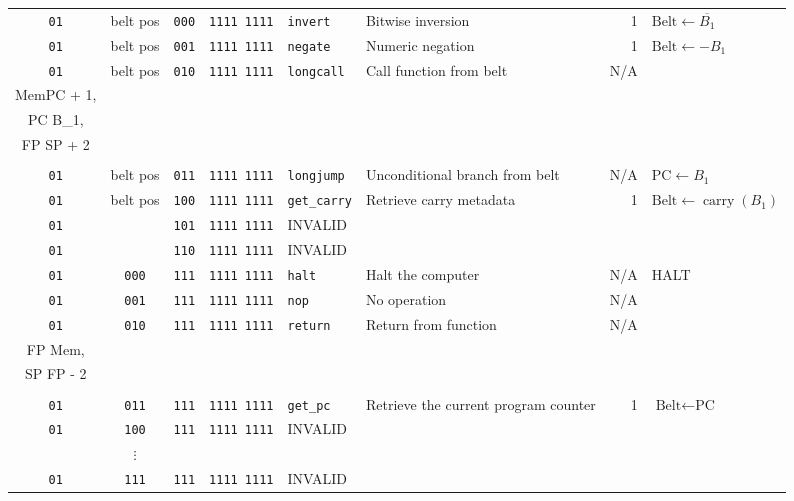 \documentclass{article}
\begin{document}
\begin{landscape}
\begin{longtable}{c c c c l l r l}
		\texttt{01} & belt pos & \texttt{000} & \texttt{1111 1111} & \texttt{invert}     & Bitwise inversion              & 1   & \(
			\textrm{Belt} \gets \overline{B_1}\) \\
		\texttt{01} & belt pos & \texttt{001} & \texttt{1111 1111} & \texttt{negate}     & Numeric negation               & 1   & \(
			\textrm{Belt} \gets -B_1\) \\
		\texttt{01} & belt pos & \texttt{010} & \texttt{1111 1111} & \texttt{longcall}   & Call function from belt        & N/A & \(
			\begin{array}{l}
				\textrm{Mem}\left[\textrm{SP}\right] \gets \textrm{FP}, \\
				\textrm{Mem}\left[\textrm{SP} + 1\right] \gets \textrm{PC} + 1, \\
				\textrm{PC} \gets B_1, \\
				\textrm{FP} \gets \textrm{SP} + 2 \\
			\end{array}\) \\
		\texttt{01} & belt pos & \texttt{011} & \texttt{1111 1111} & \texttt{longjump}   & Unconditional branch from belt & N/A & \(
			\textrm{PC} \gets B_1\) \\
		\texttt{01} & belt pos & \texttt{100} & \texttt{1111 1111} & \texttt{get\_carry} & Retrieve carry metadata        & 1   & \(
			\textrm{Belt} \gets \operatorname{carry}\left(B_1\right)\) \\
		\texttt{01} & & \texttt{101} & \texttt{1111 1111} & INVALID & \\
		\texttt{01} & & \texttt{110} & \texttt{1111 1111} & INVALID & \\
		\texttt{01} & \texttt{000} & \texttt{111} & \texttt{1111 1111} & \texttt{halt}    & Halt the computer                    & N/A & HALT \\
		\texttt{01} & \texttt{001} & \texttt{111} & \texttt{1111 1111} & \texttt{nop}     & No operation                         & N/A & \\
		\texttt{01} & \texttt{010} & \texttt{111} & \texttt{1111 1111} & \texttt{return}  & Return from function                 & N/A & \(
			\begin{array}{l}
				\textrm{PC} \gets \textrm{Mem}\left[\textrm{FP} - 1\right], \\
				\textrm{FP} \gets \textrm{Mem}\left[\textrm{FP} - 2\right], \\
				\textrm{SP} \gets \textrm{FP} - 2 \\
			\end{array}\) \\
		\texttt{01} & \texttt{011} & \texttt{111} & \texttt{1111 1111} & \texttt{get\_pc} & Retrieve the current program counter & 1   & \(
			\textrm{Belt} \gets \textrm{PC}\) \\
		\texttt{01} & \texttt{100} & \texttt{111} & \texttt{1111 1111} & INVALID & \\
		            & \(\vdots\)   &              &                    &         & \\
		\texttt{01} & \texttt{111} & \texttt{111} & \texttt{1111 1111} & INVALID & \\


\end{longtable}
\end{landscape}
\end{document}
